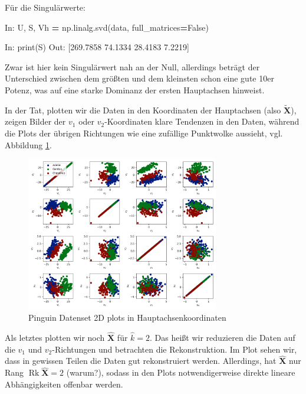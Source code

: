 \documentclass[]{book}
\newenvironment{Shaded}{\begin{snugshade}}{\end{snugshade}}
\newcommand{\BuiltInTok}[1]{#1}
\newcommand{\FloatTok}[1]{\textcolor[rgb]{0.00,0.00,0.81}{#1}}
\newcommand{\NormalTok}[1]{#1}
\newcommand{\OperatorTok}[1]{\textcolor[rgb]{0.81,0.36,0.00}{\textbf{#1}}}
\newcommand{\VariableTok}[1]{\textcolor[rgb]{0.00,0.00,0.00}{#1}}
\theoremstyle{definition}
\theoremstyle{definition}
\theoremstyle{definition}
\theoremstyle{definition}
\theoremstyle{remark}
\begin{document}
Für die Singulärwerte:

\begin{Shaded}
\begin{Highlighting}[]
\NormalTok{In: U, S, Vh }\OperatorTok{=}\NormalTok{ np.linalg.svd(data, full_matrices}\OperatorTok{=}\VariableTok{False}\NormalTok{)}

\NormalTok{In: }\BuiltInTok{print}\NormalTok{(S)}
\NormalTok{Out: [}\FloatTok{269.7858}  \FloatTok{74.1334}  \FloatTok{28.4183}   \FloatTok{7.2219}\NormalTok{]}
\end{Highlighting}
\end{Shaded}

Zwar ist hier kein Singulärwert nah an der Null, allerdings beträgt der Unterschied zwischen dem größten und dem kleinsten schon eine gute 10er Potenz, was auf eine starke Dominanz der ersten Hauptachsen hinweist.

In der Tat, plotten wir die Daten in den Koordinaten der Hauptachsen (also \(\tilde {\mathbf{X}}\)), zeigen Bilder der \(v_1\) oder \(v_2\)-Koordinaten klare Tendenzen in den Daten, während die Plots der übrigen Richtungen wie eine zufällige Punktwolke aussieht, vgl. Abbildung \ref{fig:05-penguin-allpairs-pcs}.

\begin{figure}
\hypertarget{fig:05-penguin-allpairs-pcs}{%
\centering
\includegraphics[width=0.75\textwidth,height=\textheight]{bilder/05-all-pairs-pcs.png}
\caption{Pinguin Datenset 2D plots in Hauptachsenkoordinaten}\label{fig:05-penguin-allpairs-pcs}
}
\end{figure}

Als letztes plotten wir noch \(\hat {{\mathbf{X}}}\) für \(\hat k =2\). Das heißt wir reduzieren die Daten auf die \(v_1\) und \(v_2\)-Richtungen und betrachten die Rekonstruktion. Im Plot sehen wir, dass in gewissen Teilen die Daten gut rekonstruiert werden. Allerdings, hat \(\hat{{\mathbf{X}}}\) nur Rang \(\operatorname{Rk} \hat {{\mathbf{X}}}=2\) (warum?), sodass in den Plots notwendigerweise direkte lineare Abhängigkeiten offenbar werden.
\end{document}
